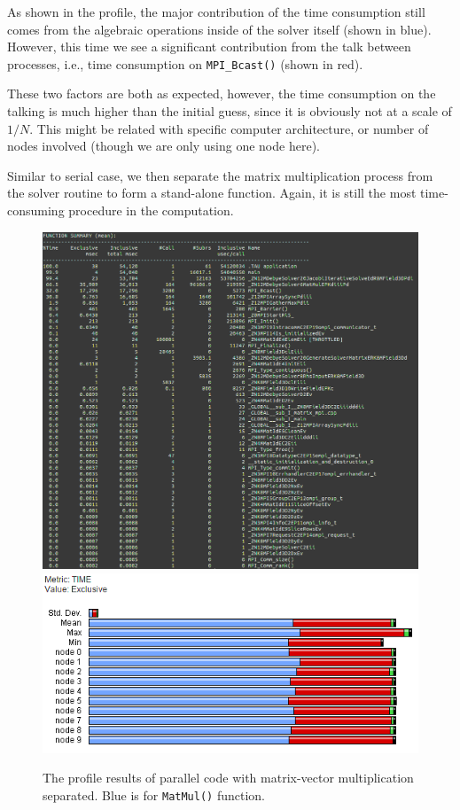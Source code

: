 \documentclass{article}
\begin{document}
\begin{spacing}{1.1}
As shown in the profile, the major contribution of the time consumption still comes from the algebraic operations inside of the solver itself (shown in blue). However, this time we see a significant contribution from the talk between processes, i.e., time consumption on \texttt{MPI\_Bcast()} (shown in red).

These two factors are both as expected, however, the time consumption on the talking is much higher than the initial guess, since it is obviously not at a scale of $1/N$. This might be related with specific computer architecture, or number of nodes involved (though we are only using one node here).

Similar to serial case, we then separate the matrix multiplication process from the solver routine to form a stand-alone function. Again, it is still the most time-consuming procedure in the computation.

\begin{figure}[H]
  \centering
  \includegraphics[width=\linewidth]{output/mpi-separated-text.png}
  \includegraphics[width=0.6\linewidth]{output/mpi-separated.png}
  \caption{The profile results of parallel code with matrix-vector multiplication separated. Blue is for \texttt{MatMul()} function.}
  \label{fig-testcase}
\end{figure}


\end{spacing}
\end{document}
